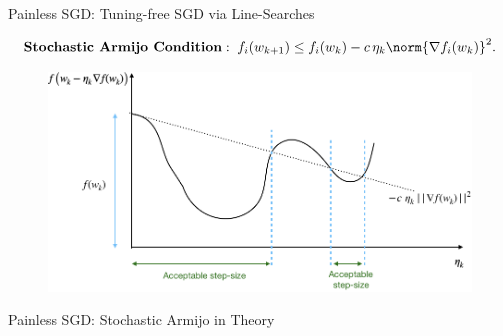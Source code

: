 \documentclass[notheorems]{beamer}
\begin{document}
    \begin{frame}{Painless SGD: Tuning-free SGD via Line-Searches}

        \[ \textbf{Stochastic Armijo Condition}: \; f_i(w_{k+1}) \leq f_i(w_k) - c \, \eta_k \norm{\nabla f_i(w_k)}^2. \]
        \begin{figure}
            \centering
            \includegraphics[width=\textwidth]{figures/armijo}
        \end{figure}

    \end{frame}

    \begin{frame}{Painless SGD: Stochastic Armijo in Theory}
        \begin{figure}
            \vspace{0.5em}

            \vspace{0.5em}

        \end{figure}
    \end{frame}
\end{document}
